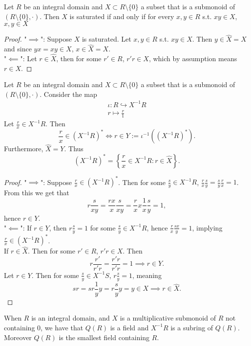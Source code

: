 \begin{lemma}
    Let $R$ be an integral domain and $X\subset R\setminus \{0\}$ a subset that is a submonoid of $(R\setminus \{0\},\cdot)$. Then $X$ is saturated if and only if for every $x,y\in R$ s.t. $xy \in X$, $x,y\in X$
\end{lemma}
\begin{proof}
    "$\implies$": Suppose $X$ is saturated. Let $x,y\in R$ s.t. $xy\in X$. Then $y\in \widehat{X}=X$ and since $yx = xy \in X$, $x\in \widehat{X} = X$.\\
    "$\impliedby$": Let $r\in \widehat{X}$, then for some $r'\in R$, $r'r\in X$, which by assumption means $r\in X$. 
\end{proof}
\begin{lemma}\label{UnitsOfLocalization}
     Let $R$ be an integral domain and $X\subset R\setminus \{0\}$ a subset that is a submonoid of $(R\setminus \{0\},\cdot)$. Consider the map 
     \begin{gather*}
         \iota : R \hookrightarrow X^{-1}R\\
         r \mapsto \frac{r}{1}
     \end{gather*}
     Let $\frac{r}{x}\in X^{-1}R$. Then 
     $$\frac{r}{x}\in \left(X^{-1}R\right)^\ast \iff r \in Y:= \iota^{-1}\left(\left(X^{-1}R\right)^\ast\right).$$
     Furthermore, $\widehat{X} = Y$. Thus 
     $$\left( X^{-1}R \right)^\ast = \left\{ \frac{r}{x}\in X^{-1}R : r \in \widehat{X}\right\}.$$
\end{lemma}
\begin{proof}
    "$\implies$": Suppose $\frac{r}{x}\in \left(X^{-1}R\right)^\ast$. Then for some $\frac{s}{y}\in X^{-1}R$, $\frac{r}{x}\frac{s}{y}=\frac{s}{y}\frac{r}{x}=1$.  From this we get that 
    $$r \frac{s}{xy} = \frac{rx}{x}\frac{s}{xy}= \frac{r}{x}x\frac{1}{x}\frac{s}{y} = 1,$$
    hence $r\in Y$.\\
    "$\impliedby$": If $r \in Y$, then $r \frac{s}{y}=1$ for some $\frac{s}{y}\in X^{-1}R$, hence $\frac{r}{x}\frac{sx}{y} = 1$, implying $\frac{r}{x} \in \left( X^{-1}R\right)^\ast$.\\
    If $r \in \widehat{X}$. Then for some $r'\in R$, $r'r\in X$. Then 
    $$r\frac{r'}{r'r} = \frac{r'r}{r'r} = 1 \implies r\in Y.$$
    Let $r \in Y$. Then for some $\frac{s}{y}\in X^{-1}S$, $r\frac{s}{y}=1$, meaning
    $$sr = sr \frac{1}{y}y = r\frac{s}{y}y= y \in X \implies r \in \widehat{X}.$$
\end{proof}
\begin{corollary}
    When $R$ is an integral domain, and $X$ is a multiplicative submonoid of $R$ not containing $0$, we have that $Q(R)$ is a field and $X^{-1}R$ is a subring of $Q(R)$. Moreover $Q(R)$ is the smallest field containing $R$.
\end{corollary}
